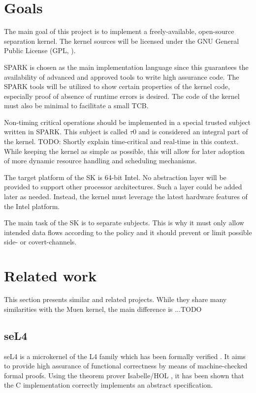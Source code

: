 \section{Goals}
The main goal of this project is to implement a freely-available, open-source
separation kernel. The kernel sources will be licensed under the GNU General
Public License (GPL, \cite{gpl}).

SPARK is chosen as the main implementation language since this guarantees the
availability of advanced and approved tools to write high assurance code. The
SPARK tools will be utilized to show certain properties of the kernel code,
especially proof of absence of runtime errors is desired. The code of the kernel
must also be minimal to facilitate a small TCB.

Non-timing critical operations should be implemented in a special trusted
subject written in SPARK. This subject is called $\tau$0 and is considered an
integral part of the kernel. TODO: Shortly explain time-critical and real-time
in this context. While keeping the kernel as simple as possible, this will
allow for later adoption of more dynamic resource handling and scheduling
mechanisms.

The target platform of the SK is 64-bit Intel. No abstraction layer will be
provided to support other processor architectures. Such a layer could be added
later as needed. Instead, the kernel must leverage the latest hardware
features of the Intel platform.

The main task of the SK is to separate subjects. This is why it must only allow
intended data flows according to the policy and it should prevent or limit
possible side- or covert-channels.

\section{Related work}
This section presents similar and related projects. While they share many
similarities with the Muen kernel, the main difference is ...TODO

\subsection{seL4}
seL4 is a microkernel of the L4 \cite{Liedtke:1996:TRM:234215.234473} family
which has been formally verified \cite{Klein_EHACDEEKNSTW_09}. It aims to
provide high assurance of functional correctness by means of machine-checked
formal proofs. Using the theorem prover Isabelle/HOL
\cite{Nipkow-Paulson-Wenzel:2002}, it has been shown that the C implementation
correctly implements an abstract specification.

